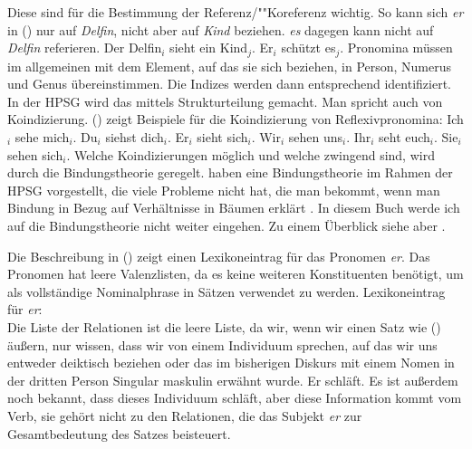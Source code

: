 Diese sind für die Bestimmung der Referenz/""Koreferenz wichtig. So kann
sich \emph{er} in () nur auf \emph{Delfin}, nicht aber auf \emph{Kind}
beziehen. \emph{es} dagegen kann nicht auf \emph{Delfin} referieren.
\ea
Der Delfin$_i$ sieht ein Kind$_j$. Er$_i$ schützt es$_j$.
\z
Pronomina müssen im allgemeinen mit dem Element, auf das sie sich beziehen, in Person,
Numerus und Genus übereinstimmen. Die Indizes werden dann entsprechend identifiziert.
In der HPSG wird das mittels Strukturteilung gemacht. Man spricht auch von Koindizierung.
() zeigt Beispiele für die Koindizierung von Reflexivpronomina:
\eal
\ex Ich$_i$ sehe mich$_i$.
\ex Du$_i$ siehst dich$_i$.
\ex Er$_i$ sieht sich$_i$.
\ex Wir$_i$ sehen uns$_i$.
\ex Ihr$_i$ seht euch$_i$.
\ex Sie$_i$ sehen sich$_i$.
\zl
Welche Koindizierungen möglich und welche zwingend sind, wird durch die Bindungstheorie
geregelt. \citet{PS92a,ps2} haben eine Bindungstheorie im Rahmen der HPSG vorgestellt, die viele Probleme
nicht hat, die man bekommt, wenn man Bindung in Bezug auf Verhältnisse in Bäumen erklärt \citep{Wechsler99a,MS98a}. In diesem Buch werde
ich auf die Bindungstheorie nicht weiter eingehen. Zu einem Überblick siehe aber
.

Die Beschreibung in () zeigt einen Lexikoneintrag für das Pronomen \emph{er}. Das Pronomen
hat leere Valenzlisten, da es keine weiteren Konstituenten benötigt, um als vollständige
Nominalphrase in Sätzen verwendet zu werden.
\eas
\label{le-er}%
Lexikoneintrag für \emph{er}:\\
\zs
Die Liste der Relationen ist die leere Liste, da wir, wenn wir einen Satz wie () äußern, nur
wissen, dass wir von einem Individuum sprechen, auf das wir uns entweder deiktisch beziehen oder das
im bisherigen Diskurs mit einem Nomen in der dritten Person Singular maskulin erwähnt wurde.
\ea
Er schläft.
\z
Es ist außerdem noch bekannt, dass dieses Individuum schläft, aber diese Information kommt vom Verb, sie
gehört nicht zu den Relationen, die das Subjekt \emph{er} zur Gesamtbedeutung des Satzes
beisteuert. 

